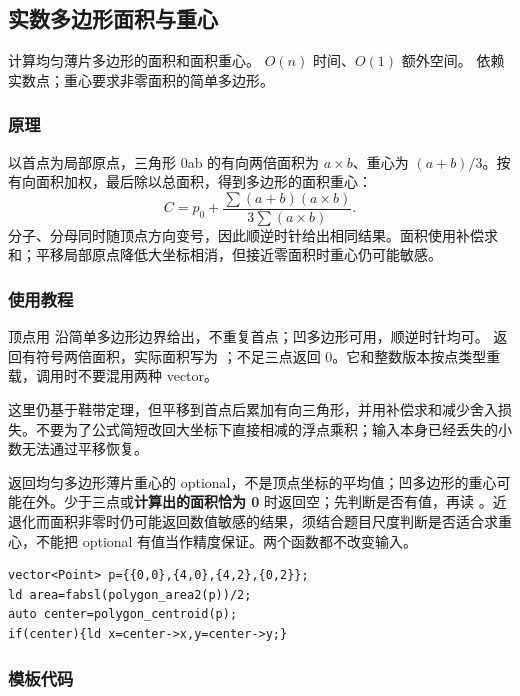 \subsection{实数多边形面积与重心}
\label{geo:polygon-real}
\AlgorithmInfo
    {计算均匀薄片多边形的面积和面积重心。}
    {$O(n)$ 时间、$O(1)$ 额外空间。}
    {依赖实数点；重心要求非零面积的简单多边形。}
\subsubsection*{原理}

以首点为局部原点，三角形 0ab 的有向两倍面积为 $a\times b$、重心为 $(a+b)/3$。按有向面积加权，最后除以总面积，得到多边形的面积重心：
\[
 C=p_0+\frac{\sum(a+b)(a\times b)}{3\sum(a\times b)}.
\]
分子、分母同时随顶点方向变号，因此顺逆时针给出相同结果。面积使用补偿求和；平移局部原点降低大坐标相消，但接近零面积时重心仍可能敏感。

\subsubsection*{使用教程}
顶点用  沿简单多边形边界给出，不重复首点；凹多边形可用，顺逆时针均可。 返回有符号两倍面积，实际面积写为 ；不足三点返回 0。它和整数版本按点类型重载，调用时不要混用两种 vector。

这里仍基于鞋带定理，但平移到首点后累加有向三角形，并用补偿求和减少舍入损失。不要为了公式简短改回大坐标下直接相减的浮点乘积；输入本身已经丢失的小数无法通过平移恢复。

 返回均匀多边形薄片重心的 optional，不是顶点坐标的平均值；凹多边形的重心可能在外。少于三点或\textbf{计算出的面积恰为 0} 时返回空；先判断是否有值，再读 。近退化而面积非零时仍可能返回数值敏感的结果，须结合题目尺度判断是否适合求重心，不能把 optional 有值当作精度保证。两个函数都不改变输入。
\begin{lstlisting}[style=mtycpp,numbers=none]
vector<Point> p={{0,0},{4,0},{4,2},{0,2}};
ld area=fabsl(polygon_area2(p))/2;
auto center=polygon_centroid(p);
if(center){ld x=center->x,y=center->y;}
\end{lstlisting}
\subsubsection*{模板代码}
